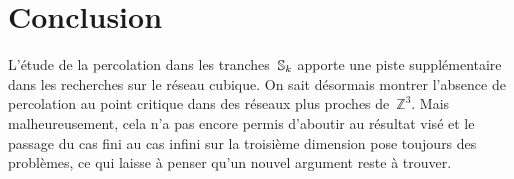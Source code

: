 \section*{Conclusion}
L'étude de la percolation dans les tranches~$\mathbb{S}_k$ apporte une piste supplémentaire dans les recherches sur le réseau cubique. On sait désormais montrer l'absence de percolation au point critique dans des réseaux plus \og{} proches \fg{} de~$\mathbb{Z}^3$. Mais malheureusement, cela n'a pas encore permis d'aboutir au résultat visé et le passage du cas fini au cas infini sur la troisième dimension pose toujours des problèmes, ce qui laisse à penser qu'un nouvel argument reste à trouver.
